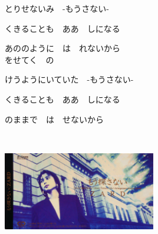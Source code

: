 {とりせないみ　-もうさない-

くきることも　ああ　しになる

あののように　は　れないから
\\

をせてく　の

けうようにいていた　-もうさない-

くきることも　ああ　しになる

のままで　は　せないから

}
{ \ }

\includegraphics[width=0.5\textwidth]{S3.jpg}
